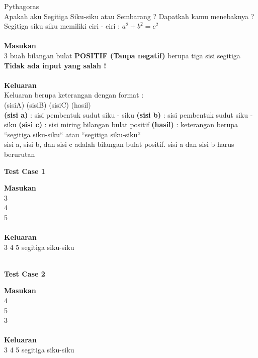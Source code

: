 \newpage
\begin{permasalahan}{Pythagoras}\\
\label{prob:pythagoras}
Apakah aku Segitiga Siku-siku atau Sembarang ? Dapatkah kamu menebaknya ? \\ 
Segitiga siku siku memiliki ciri - ciri : \begin{math}a^{2} + b^{2} = c^{2}\end{math}\\\\
	\textbf{Masukan}\\
	3 buah bilangan bulat \textbf{POSITIF (Tanpa negatif)} berupa tiga sisi segitiga\\
	\textbf{Tidak ada input yang salah !}\\\\
	\textbf{Keluaran}\\
	Keluaran berupa keterangan dengan format :\\
	(sisiA) (sisiB) (sisiC) (hasil)\\	
	\textbf{(sisi a)} : sisi pembentuk sudut siku - siku
	\textbf{(sisi b)} : sisi pembentuk sudut siku - siku
	\textbf{(sisi c)} : sisi miring bilangan bulat positif 
	\textbf{(hasil)} : keterangan berupa ``segitiga siku-siku`` atau ``segitiga siku-siku``\\

	sisi a, sisi b, dan sisi c adalah bilangan bulat positif. 
	sisi a dan sisi b harus berurutan

	\begin{center}
	\textbf{Test Case 1}\\
	\end{center}
	\textbf{Masukan}\\
	3 \\
	4 \\
	5 \\\\
	\textbf{Keluaran}\\
	3 4 5 segitiga siku-siku \\\\
	
	\begin{center}
	\textbf{Test Case 2}\\
	\end{center}
	\textbf{Masukan}\\
	4 \\
	5 \\
	3 \\\\
	\textbf{Keluaran}\\
	3 4 5 segitiga siku-siku \\\\


\end{permasalahan}
